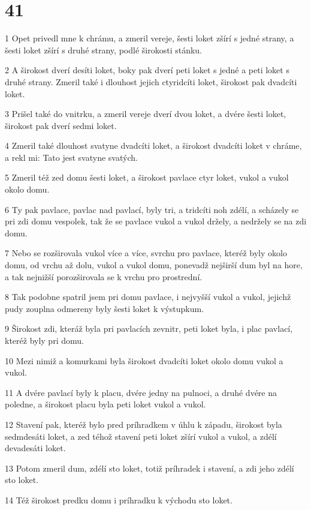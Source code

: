 \chapter{41}

\par 1 Opet privedl mne k chrámu, a zmeril vereje, šesti loket zšírí s jedné strany, a šesti loket zšírí s druhé strany, podlé širokosti stánku.
\par 2 A širokost dverí desíti loket, boky pak dverí peti loket s jedné a peti loket s druhé strany. Zmeril také i dlouhost jejich ctyridcíti loket, širokost pak dvadcíti loket.
\par 3 Prišel také do vnitrku, a zmeril vereje dverí dvou loket, a dvére šesti loket, širokost pak dverí sedmi loket.
\par 4 Zmeril také dlouhost svatyne dvadcíti loket, a širokost dvadcíti loket v chráme, a rekl mi: Tato jest svatyne svatých.
\par 5 Zmeril též zed domu šesti loket, a širokost pavlace ctyr loket, vukol a vukol okolo domu.
\par 6 Ty pak pavlace, pavlac nad pavlací, byly tri, a tridcíti noh zdélí, a scházely se pri zdi domu vespolek, tak že se pavlace vukol a vukol držely, a nedržely se na zdi domu.
\par 7 Nebo se rozširovala vukol více a více, svrchu pro pavlace, kteréž byly okolo domu, od vrchu až dolu, vukol a vukol domu, ponevadž nejširší dum byl na hore, a tak nejnižší porozširovala se k vrchu pro prostrední.
\par 8 Tak podobne spatril jsem pri domu pavlace, i nejvyšší vukol a vukol, jejichž pudy zouplna odmereny byly šesti loket k výstupkum.
\par 9 Širokost zdi, kteráž byla pri pavlacích zevnitr, peti loket byla, i plac pavlací, kteréž byly pri domu.
\par 10 Mezi nimiž a komurkami byla širokost dvadcíti loket okolo domu vukol a vukol.
\par 11 A dvére pavlací byly k placu, dvére jedny na pulnoci, a druhé dvére na poledne, a širokost placu byla peti loket vukol a vukol.
\par 12 Stavení pak, kteréž bylo pred príhradkem v úhlu k západu, širokost byla sedmdesáti loket, a zed téhož stavení peti loket zšírí vukol a vukol, a zdélí devadesáti loket.
\par 13 Potom zmeril dum, zdélí sto loket, totiž príhradek i stavení, a zdi jeho zdélí sto loket.
\par 14 Též širokost predku domu i príhradku k východu sto loket.
